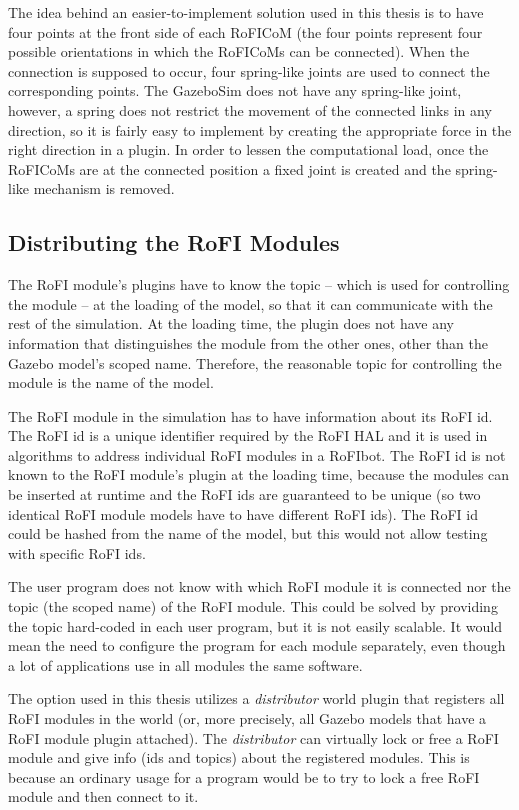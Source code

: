 \documentclass[
  printed, %
  color,   %
  notable, %
  oneside, %
  nolof,   %
  nolot,   %
  nocover,
]{fithesis3}
\begin{document}
The idea behind an easier-to-implement solution used in this thesis is to have four points at the front side of each RoFICoM (the four points represent four possible orientations in which the RoFICoMs can be connected).
When the connection is supposed to occur, four spring-like joints are used to connect the corresponding points.
The GazeboSim does not have any spring-like joint, however, a spring does not restrict the movement of the connected links in any direction, so it is fairly easy to implement by creating the appropriate force in the right direction in a plugin.
In order to lessen the computational load, once the RoFICoMs are at the connected position a fixed joint is created and the spring-like mechanism is removed.

\subsection{Distributing the RoFI Modules}

The RoFI module's plugins have to know the topic -- which is used for controlling the module -- at the loading of the model, so that it can communicate with the rest of the simulation.
At the loading time, the plugin does not have any information that distinguishes the module from the other ones, other than the Gazebo model's scoped name.
Therefore, the reasonable topic for controlling the module is the name of the model.

The RoFI module in the simulation has to have information about its RoFI id.
The RoFI id is a unique identifier required by the RoFI HAL and it is used in algorithms to address individual RoFI modules in a RoFIbot.
The RoFI id is not known to the RoFI module's plugin at the loading time, because the modules can be inserted at runtime and the RoFI ids are guaranteed to be unique (so two identical RoFI module models have to have different RoFI ids).
The RoFI id could be hashed from the name of the model, but this would not allow testing with specific RoFI ids.

The user program does not know with which RoFI module it is connected nor the topic (the scoped name) of the RoFI module.
This could be solved by providing the topic hard-coded in each user program, but it is not easily scalable.
It would mean the need to configure the program for each module separately, even though a lot of applications use in all modules the same software.

The option used in this thesis utilizes a \emph{distributor} world plugin that registers all RoFI modules in the world (or, more precisely, all Gazebo models that have a RoFI module plugin attached).
The \emph{distributor} can virtually lock or free a RoFI module and give info (ids and topics) about the registered modules.
This is because an ordinary usage for a program would be to try to lock a free RoFI module and then connect to it.
\end{document}
